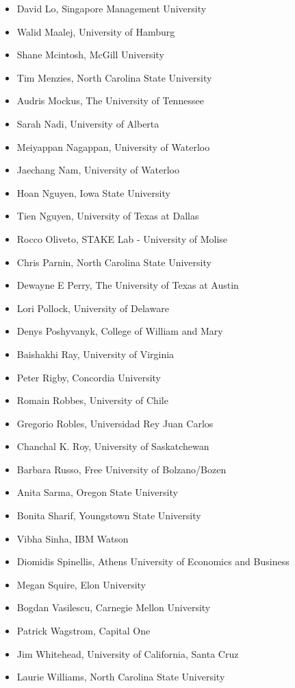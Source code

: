 \documentclass[a4paper]{report}
\begin{document}
\begin{itemize}
\item David Lo, Singapore Management University
\item Walid Maalej, University of Hamburg
\item Shane Mcintosh, McGill University
\item Tim Menzies, North Carolina State University
\item Audris Mockus, The University of Tennessee
\item Sarah Nadi, University of Alberta
\item Meiyappan Nagappan, University of Waterloo
\item Jaechang Nam, University of Waterloo
\item Hoan Nguyen, Iowa State University
\item Tien Nguyen, University of Texas at Dallas
\item Rocco Oliveto, STAKE Lab - University of Molise
\item Chris Parnin, North Carolina State University
\item Dewayne E Perry, The University of Texas at Austin
\item Lori Pollock, University of Delaware
\item Denys Poshyvanyk, College of William and Mary
\item Baishakhi Ray, University of Virginia
\item Peter Rigby, Concordia University
\item Romain Robbes, University of Chile
\item Gregorio Robles, Universidad Rey Juan Carlos
\item Chanchal K. Roy, University of Saskatchewan
\item Barbara  Russo, Free University of Bolzano/Bozen
\item Anita Sarma, Oregon State University
\item Bonita Sharif, Youngstown State University
\item Vibha Sinha, IBM Watson
\item Diomidis Spinellis, Athens University of Economics and Business
\item Megan Squire, Elon University
\item Bogdan Vasilescu, Carnegie Mellon University
\item Patrick Wagstrom, Capital One
\item Jim Whitehead, University of California, Santa Cruz
\item Laurie Williams, North Carolina State University

\end{itemize}
\end{document}
